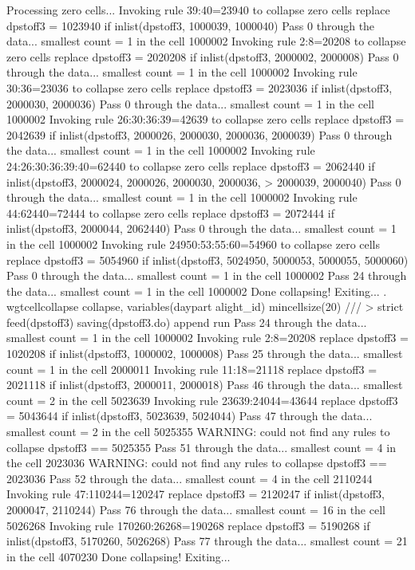 {\smallskip}
Processing zero cells...
{\smallskip}
  Invoking rule 39:40=23940 to collapse zero cells
  replace dpstoff3 = 1023940 if inlist(dpstoff3, 1000039, 1000040)
Pass 0 through the data...
  smallest count = 1 in the cell      1000002
  Invoking rule 2:8=20208 to collapse zero cells
  replace dpstoff3 = 2020208 if inlist(dpstoff3, 2000002, 2000008)
Pass 0 through the data...
  smallest count = 1 in the cell      1000002
  Invoking rule 30:36=23036 to collapse zero cells
  replace dpstoff3 = 2023036 if inlist(dpstoff3, 2000030, 2000036)
Pass 0 through the data...
  smallest count = 1 in the cell      1000002
  Invoking rule 26:30:36:39=42639 to collapse zero cells
  replace dpstoff3 = 2042639 if inlist(dpstoff3, 2000026, 2000030, 2000036, 2000039)
Pass 0 through the data...
  smallest count = 1 in the cell      1000002
  Invoking rule 24:26:30:36:39:40=62440 to collapse zero cells
  replace dpstoff3 = 2062440 if inlist(dpstoff3, 2000024, 2000026, 2000030, 2000036,
>  2000039, 2000040)
Pass 0 through the data...
  smallest count = 1 in the cell      1000002
  Invoking rule 44:62440=72444 to collapse zero cells
  replace dpstoff3 = 2072444 if inlist(dpstoff3, 2000044, 2062440)
\smallskip
\oom
\smallskip
Pass 0 through the data...
  smallest count = 1 in the cell      1000002
  Invoking rule 24950:53:55:60=54960 to collapse zero cells
  replace dpstoff3 = 5054960 if inlist(dpstoff3, 5024950, 5000053, 5000055, 5000060)
Pass 0 through the data...
  smallest count = 1 in the cell      1000002
Pass 24 through the data...
  smallest count = 1 in the cell      1000002
  Done collapsing! Exiting...
{\smallskip}
. wgtcellcollapse collapse, variables(daypart alight_id) mincellsize(20) ///
>         strict feed(dpstoff3) saving(dpstoff3.do) append run
Pass 24 through the data...
  smallest count = 1 in the cell      1000002
  Invoking rule 2:8=20208
  replace dpstoff3 = 1020208 if inlist(dpstoff3, 1000002, 1000008)
Pass 25 through the data...
  smallest count = 1 in the cell      2000011
  Invoking rule 11:18=21118
  replace dpstoff3 = 2021118 if inlist(dpstoff3, 2000011, 2000018)
\smallskip
\oom
\smallskip
Pass 46 through the data...
  smallest count = 2 in the cell      5023639
  Invoking rule 23639:24044=43644
  replace dpstoff3 = 5043644 if inlist(dpstoff3, 5023639, 5024044)
Pass 47 through the data...
  smallest count = 2 in the cell      5025355
  WARNING: could not find any rules to collapse dpstoff3 == 5025355
\smallskip
\oom
\smallskip
Pass 51 through the data...
  smallest count = 4 in the cell      2023036
  WARNING: could not find any rules to collapse dpstoff3 == 2023036
Pass 52 through the data...
  smallest count = 4 in the cell      2110244
  Invoking rule 47:110244=120247
  replace dpstoff3 = 2120247 if inlist(dpstoff3, 2000047, 2110244)
\smallskip
\oom
\smallskip
Pass 76 through the data...
  smallest count = 16 in the cell      5026268
  Invoking rule 170260:26268=190268
  replace dpstoff3 = 5190268 if inlist(dpstoff3, 5170260, 5026268)
Pass 77 through the data...
  smallest count = 21 in the cell      4070230
  Done collapsing! Exiting...
